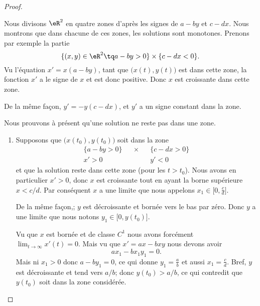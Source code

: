 \begin{proof}
\begin{subproof}

		Nous divisons \( \eR^2\) en quatre zones d'après les signes de \( a-by\) et \( c-dx\). Nous montrons que dans chacune de ces zones, les solutions sont monotones. Prenons par exemple la partie
		\begin{equation}
			\{  (x,y)\in \eR^2\tq   a-by>0 \}\times\{ c-dx<0 \}.
		\end{equation}
		Vu l'équation \( x'=x(a-by)\), tant que \( \big( x(t),y(t) \big)\) est dans cette zone, la fonction \( x'\) a le signe de \( x\) et est donc positive. Donc \( x\) est croissante dans cette zone.

		De la même façon, \( y'=-y(c-dx)\), et \( y'\) a un signe constant dans la zone.


		Nous prouvons à présent qu'une solution ne reste pas dans une zone.

		\begin{enumerate}
			\item
			      Supposons que \( \big( x(t_0),y(t_0) \big) \) soit dans la zone
			      \begin{subequations}
				      \begin{align}
					      \{ a-by>0 \} &  & \times &  & \{ c-dx>0 \} \\
					      x'>0         &  &        &  & y'<0
				      \end{align}
			      \end{subequations}
			      et que la solution reste dans cette zone (pour les \( t>t_0\)). Nous avons en particulier \( x'>0\), donc \( x\) est croissante tout en ayant la borne supérieure \(  x<c/d \). Par conséquent \( x\) a une limite que nous appelons \( x_1\in \mathopen[ 0 , \frac{ c }{ d } \mathclose]\).

			      De la même façon,; \( y\) est décroissante et bornée vers le bas par zéro. Donc \( y\) a une limite que nous notons \( y_1\in\mathopen[ 0 , y(t_0) \mathclose]\).

			      Vu que \( x\) est bornée et de classe \( C^1\) nous avons forcément \( \lim_{t\to \infty} x'(t)=0\). Mais vu que \( x'=ax-bxy\) nous devons avoir
			      \begin{equation}
				      ax_1-bx_1y_1=0.
			      \end{equation}
			      Mais ni \( x_1>0\) donc \( a-by_1=0\), ce qui donne \( y_1=\frac{ a }{ b }\) et aussi \( x_1=\frac{ c }{ d }\). Bref, \( y\) est décroissante et tend vers \( a/b\); donc \( y(t_0)>a/b\), ce qui contredit que \( y(t_0)\) soit dans la zone considérée.


\end{enumerate}
\end{subproof}
\end{proof}
